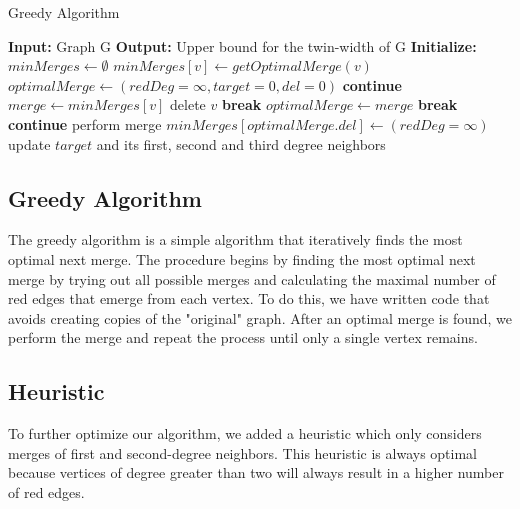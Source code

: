 \documentclass[10pt]{article}
\begin{document}
\begin{algorithm}[H]
    \caption{Greedy Algorithm}
    \label{alg:greedy}
    \begin{algorithmic}[1]
        \State \textbf{Input:} Graph G
        \State \textbf{Output:} Upper bound for the twin-width of G
        \State \textbf{Initialize:} $minMerges \gets \emptyset$
        \State $minMerges[v] \gets getOptimalMerge(v)$
        \EndFor
        \State $optimalMerge \gets (redDeg = \infty, target = 0, del = 0)$
        \State \textbf{continue}
        \EndIf
        \State $merge \gets minMerges[v]$
        \State delete $v$
        \State \textbf{break}
        \EndIf
        \State $optimalMerge \gets merge$
        \EndIf
        \State \textbf{break}
        \EndIf
        \EndFor
        \State \textbf{continue}
        \EndIf
        \State perform merge
        \State $minMerges[optimalMerge.del] \gets (redDeg = \infty)$
        \State update $target$ and its first, second and third degree neighbors
        \EndFor
    \end{algorithmic}
\end{algorithm}

\subsection{Greedy Algorithm}
The greedy algorithm is a simple algorithm that iteratively finds the most optimal next
merge. The procedure begins by finding the most optimal next merge by trying out all
possible merges and calculating the maximal number of red edges that emerge from each
vertex. To do this, we have written code that avoids creating copies of the "original"
graph. After an optimal merge is found, we perform the merge and repeat the process until
only a single vertex remains.

\subsection{Heuristic}
To further optimize our algorithm, we added a heuristic which only considers merges of
first and second-degree neighbors. This heuristic is always optimal because vertices of
degree greater than two will always result in a higher number of red edges.
\end{document}
